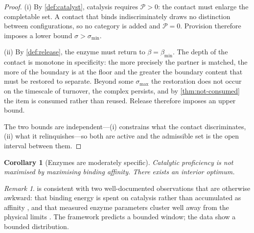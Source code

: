 \documentclass[11pt,twocolumn,a4paper]{article}
\theoremstyle{plain}
\newtheorem{corollary}[theorem]{Corollary}
\theoremstyle{definition}
\theoremstyle{remark}
\newtheorem{remark}[theorem]{Remark}
\newcommand{\thick}{\beta}
\newcommand{\floor}{\thick_{\min}}
\newcommand{\prov}{\mathcal{P}}
\begin{document}
\begin{proof}
(i) By \cref{def:catalyst}, catalysis requires $\prov > 0$: the contact must
enlarge the completable set. A contact that binds indiscriminately draws no
distinction between configurations, so no category is added and $\prov = 0$.
Provision therefore imposes a lower bound $\sigma > \sigma_{\min}$.

(ii) By \cref{def:release}, the enzyme must return to $\thick = \floor$. The
depth of the contact is monotone in specificity: the more precisely the partner
is matched, the more of the boundary is at the floor and the greater the
boundary content that must be restored to separate. Beyond some
$\sigma_{\max}$ the restoration does not occur on the timescale of turnover, the
complex persists, and by \cref{thm:not-consumed} the item is consumed rather
than reused. Release therefore imposes an upper bound.

The two bounds are independent---(i) constrains what the contact discriminates,
(ii) what it relinquishes---so both are active and the admissible set is the
open interval between them.
\end{proof}

\begin{corollary}[Enzymes are moderately specific]
\label{cor:moderate}
Catalytic proficiency is not maximised by maximising binding affinity. There
exists an interior optimum.
\end{corollary}

\begin{remark}
 is consistent with two well-documented observations that are
otherwise awkward: that binding energy is spent on catalysis rather than
accumulated as affinity \citep{jencks1975}, and that measured enzyme parameters
cluster well away from the physical limits \citep{barevenn2011}. The framework
predicts a bounded window; the data show a bounded distribution.
\end{remark}
\end{document}
